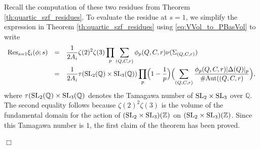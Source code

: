 \documentclass{article}
\def\Z{{\mathbb Z}}
\def\SL{{\rm SL}}
\def\Aut{{\rm Aut}}
\def\Res{{\rm Res}}
\def\Q{{\mathbb Q}}
\def\Z{{\mathbb Z}}
\def\Q{{\mathbb Q}}
\newenvironment{proof}{\noindent {\bf Proof:}}{$\Box$ \vspace{2 ex}}
\begin{document}
\begin{proof}
Recall the computation of these two residues from Theorem \ref{th:quartic_szf_residues}. To evaluate the residue at $s=1$, we simplify the expression in Theorem \ref{th:quartic_szf_residues} using \eqref{eq:VVol_to_PBasVol} to write
\begin{equation*}
\begin{array}{rcl}
\Res_{s=1}\xi_{i}(\phi;s)&=&\displaystyle \frac{1}{2A_i}\zeta(2)^2\zeta(3)\prod_p\sum_{(Q,C,r)}\phi_p(Q,C,r)\nu(\Sigma_{(Q,C,r)})
\\[.2in]
&=&\displaystyle
\frac{1}{2A_i}\tau(\SL_2(\Q)\times\SL_3(\Q))\prod_p
\Bigl(1-\frac{1}{p}\Bigr)\Bigl(\sum_{(Q,C,r)}\frac{\phi_p(Q,C,r)|\Delta(Q)|_p}{\#\Aut((Q,C,r)}\Bigr),
\end{array}
\end{equation*}
where $\tau(\SL_2(\Q)\times\SL_3(\Q)$ denotes the Tamagawa number of $\SL_2\times\SL_3$ over $\Q$. The second equality follows because $\zeta(2)^2\zeta(3)$ is the volume of the fundamental domain for the action of $(\SL_2\times\SL_3)(\Z)$ on $(\SL_2\times\SL_3)(\Z)$. Since this Tamagawa number is $1$, the first claim of the theorem has been proved.


\end{proof}
\end{document}
